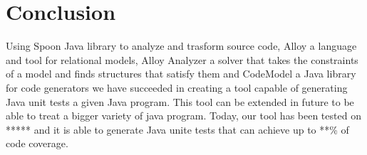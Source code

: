 \chapter*{Conclusion}
\label{ch:Conclusion}
	\thispagestyle{conclusion}
	 Using Spoon Java library to analyze and trasform source code, Alloy a language and tool for relational models, Alloy Analyzer a solver that takes the constraints of a model and finds structures that satisfy them and CodeModel a Java library for code generators we have succeeded in creating a tool capable of generating Java unit tests a given Java program. This tool can be extended in future to be able to treat a bigger variety of java program. Today, our tool has been tested on ***** and it is able to generate Java unite tests that can achieve up to **\% of code coverage.